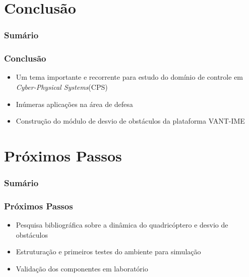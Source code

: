 \documentclass{beamer}
\begin{document}
\section{Conclusão}

\begin{frame}
	\frametitle{Sumário}
	\tableofcontents[currentsection]
\end{frame}

\begin{frame}
	
	\frametitle{Conclusão}
	
	\begin{itemize}	
		
		\item  Um tema importante e recorrente para estudo do domínio de controle em \textit{Cyber-Physical Systems}(CPS) 
		
		
		\item Inúmeras aplicações na área de defesa
		
		\item Construção do módulo de desvio de obstáculos da plataforma VANT-IME 
		
		
	\end{itemize}	
	
	
\end{frame}	

\section{Próximos Passos}

\begin{frame}
	\frametitle{Sumário}
	\tableofcontents[currentsection]
\end{frame}

\begin{frame}
	
	\frametitle{Próximos Passos}
	
	\begin{itemize}	
		
		\item  Pesquisa bibliográfica sobre a dinâmica do quadricóptero e desvio de obstáculos
		
		
		\item Estruturação e primeiros testes do ambiente para simulação 
		
	    \item Validação dos componentes em laboratório 
	    
	    
		
		
	\end{itemize}	
	
	
\end{frame}
\end{document}
